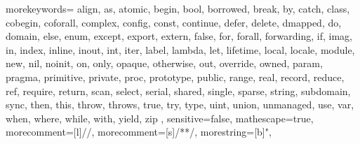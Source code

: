   {
    morekeywords={
      align, as, atomic,
      begin, bool, borrowed, break, by,
      catch, class, cobegin, coforall, complex, config, const, continue,
      defer, delete, dmapped, do, domain,
      else, enum, except, export, extern,
      false, for, forall, forwarding,
      if, imag, in, index, inline, inout, int, iter,
      label, lambda, let, lifetime, local, locale,
      module,
      new, nil, noinit,
      on, only, opaque, otherwise, out, override, owned,
      param, pragma, primitive, private, proc, prototype, public,
      range, real, record, reduce, ref, require, return,
      scan, select, serial, shared, single, sparse, string, subdomain, sync,
      then, this, throw, throws, true, try, type,
      uint, union, unmanaged, use,
      var,
      when, where, while, with,
      yield,
      zip
    },
    sensitive=false,
    mathescape=true,
    morecomment=[l]{//},
    morecomment=[s]{/*}{*/},
    morestring=[b]",
}




\newcommand{\chpl}[1]{\Verb!#1!}
\newcommand{\varname}[1]{\emph{#1}}
\newcommand{\typename}[1]{\emph{#1}}
\newcommand{\fnname}[1]{\chpl{#1}}


